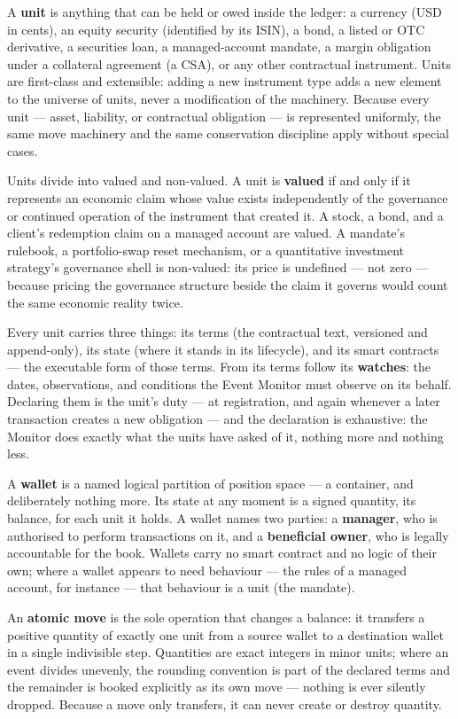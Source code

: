 \documentclass[11pt,a4paper]{article}
\begin{document}
A \textbf{unit} is anything that can be held or owed inside the ledger:
a currency (USD in cents), an equity security (identified by its ISIN),
a bond, a listed or OTC derivative, a securities loan, a managed-account
mandate, a margin obligation under a collateral agreement (a CSA), or
any other contractual instrument. Units are first-class and extensible:
adding a new instrument type adds a new element to the universe of
units, never a modification of the machinery. Because every unit ---
asset, liability, or contractual obligation --- is represented
uniformly, the same move machinery and the same conservation discipline
apply without special cases.

Units divide into valued and non-valued. A unit is \textbf{valued} if
and only if it represents an economic claim whose value exists
independently of the governance or continued operation of the instrument
that created it. A stock, a bond, and a client's redemption claim on a
managed account are valued. A mandate's rulebook, a portfolio-swap reset
mechanism, or a quantitative investment strategy's governance shell is
non-valued: its price is undefined --- not zero --- because pricing the
governance structure beside the claim it governs would count the same
economic reality twice.

Every unit carries three things: its terms (the contractual text,
versioned and append-only), its state (where it stands in its
lifecycle), and its smart contracts --- the executable form of those
terms. From its terms follow its \textbf{watches}: the dates,
observations, and conditions the Event Monitor must observe on its
behalf. Declaring them is the unit's duty --- at registration, and again
whenever a later transaction creates a new obligation --- and the
declaration is exhaustive: the Monitor does exactly what the units have
asked of it, nothing more and nothing less.

A \textbf{wallet} is a named logical partition of position space --- a
container, and deliberately nothing more. Its state at any moment is a
signed quantity, its balance, for each unit it holds. A wallet names two
parties: a \textbf{manager}, who is authorised to perform transactions
on it, and a \textbf{beneficial owner}, who is legally accountable for
the book. Wallets carry no smart contract and no logic of their own;
where a wallet appears to need behaviour --- the rules of a managed
account, for instance --- that behaviour is a unit (the mandate).

An \textbf{atomic move} is the sole operation that changes a balance: it
transfers a positive quantity of exactly one unit from a source wallet
to a destination wallet in a single indivisible step. Quantities are
exact integers in minor units; where an event divides unevenly, the
rounding convention is part of the declared terms and the remainder is
booked explicitly as its own move --- nothing is ever silently dropped.
Because a move only transfers, it can never create or destroy quantity.
\end{document}
